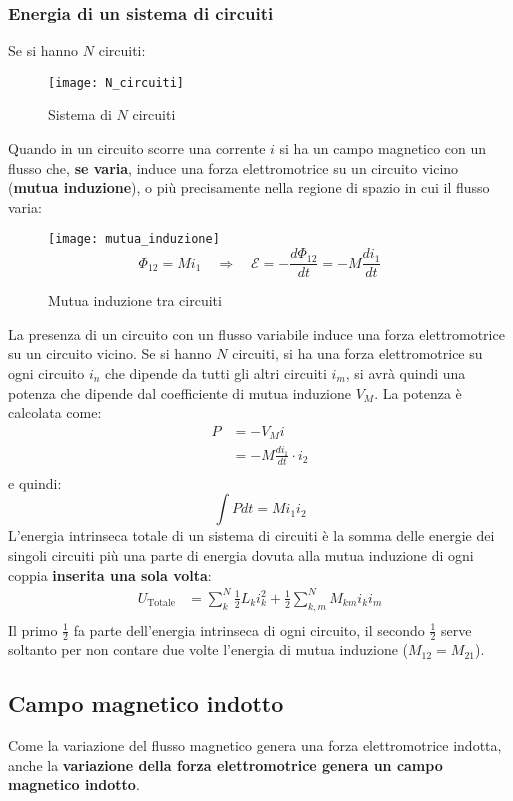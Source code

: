\documentclass[a4paper]{article}
\begin{document}
\subsubsection{Energia di un sistema di circuiti}
Se si hanno \( N \) circuiti:
\begin{figure}[H]
  \centering
  \texttt{[image: N\_circuiti]}
  \caption{Sistema di \( N \) circuiti}
\end{figure}
\noindent
Quando in un circuito scorre una corrente \( i \) si ha un campo magnetico con un flusso
che, \textbf{se varia}, induce una forza elettromotrice su un circuito vicino (\textbf{mutua induzione}),
o più precisamente nella regione di spazio in cui il flusso varia:
\begin{figure}[H]
  \centering
  \texttt{[image: mutua\_induzione]}
  \[
    \Phi_{12} = M i_1 \quad \Rightarrow \quad \mathcal{E} = - \frac{d \Phi_{12}}{dt} = - M \frac{di_1}{dt}
  \] 
  \caption{Mutua induzione tra circuiti}
\end{figure}
\noindent
La presenza di un circuito con un flusso variabile induce una forza elettromotrice
su un circuito vicino. Se si hanno \( N \) circuiti, si ha una forza elettromotrice
su ogni circuito \( i_n \) che dipende da tutti gli altri circuiti \( i_m \), si avrà
quindi una potenza che dipende dal coefficiente di mutua induzione \( V_M \). La potenza
è calcolata come:
\[
  \begin{aligned}
    P &= - V_M i\\
      &= -M \frac{di_1}{dt} \cdot i_2\\
  \end{aligned}
\] 
e quindi:
\[
  \int P dt = M i_1 i_2
\] 
L'energia intrinseca totale di un sistema di circuiti è la somma delle energie dei singoli
circuiti più una parte di energia dovuta alla mutua induzione di ogni coppia
\textbf{inserita una sola volta}:
\[
  \begin{aligned}
    U_{\text{Totale}} &= \sum_{k}^N \frac{1}{2} L_k i_k^2 
    + \frac{1}{2} \sum_{k,m}^N M_{km} i_k i_m\\
  \end{aligned}
\] 
Il primo $\frac{1}{2}$ fa parte dell'energia intrinseca di ogni circuito, il secondo
$\frac{1}{2}$ serve soltanto per non contare due volte l'energia di mutua induzione
(\( M_{12} = M_{21} \)).

\subsection{Campo magnetico indotto}
Come la variazione del flusso magnetico genera una forza elettromotrice indotta, anche
la \textbf{variazione della forza elettromotrice genera un campo magnetico indotto}.
\end{document}
